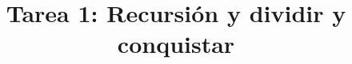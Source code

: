 \documentclass{doc}
\title{Tarea 1: Recursión y dividir y conquistar}
\begin{document}
\makedocheader
\end{document}
